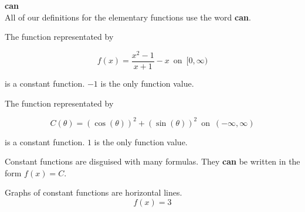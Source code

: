 \documentclass{ximera}
\begin{document}
\begin{warning}   \textbf{\textcolor{red!80!black}{can}}  \\

All of our definitions for the elementary functions use the word \textbf{\textcolor{red!80!black}{can}}.


\begin{example}

The function representated by 

\[ f(x) = \frac{x^2 - 1}{x + 1} - x  \,  \text{ on } \,   [0, \infty)   \]

is a constant function.   $-1$ is the only function value.


\end{example}





\begin{example}

The function representated by 

\[ C(\theta) = (\cos(\theta))^2 + (\sin(\theta))^2   \,  \text{ on } \,   (-\infty, \infty)   \]

is a constant function.   $1$ is the only function value.


\end{example}




Constant functions are disguised with many formulas.  They \textbf{\textcolor{red!80!black}{can}} be written in the form $f(x) = C$.



\end{warning}




Graphs of constant functions are horizontal lines.
\[ f(x) = 3\]
\end{document}
